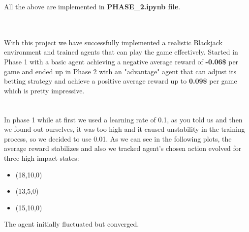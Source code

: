 \documentclass{article}
\begin{document}
\noindent All the above are implemented in {\bf PHASE\_2.ipynb file}.\\\\

\newpage

\\
With this project we have successfully implemented a realistic Blackjack environment
and trained agents that can play the game effectively. Started in Phase 1 with a basic
agent achieving a negative average reward of {\bf-0.06\$} per game
and ended up in Phase 2 with an "advantage" agent that can adjust its betting strategy
and achieve a positive average reward up to {\bf 0.09\$} per game which is
pretty impressive.\\\\


\\
In phase 1 while at first we used a learning rate of 0.1, as you told us and
then we found out ourselves, it was too high and it caused unstability in the training process,
so we decided to use 0.01. As we can see in the following plots,
the average reward stabilizes and also we tracked agent’s chosen action evolved for 
three high-impact states:
\begin{itemize}
  \item (18,10,0)
  \item (13,5,0)
  \item (15,10,0)
\end{itemize}
\noindent The agent initially fluctuated but converged.
\end{document}
